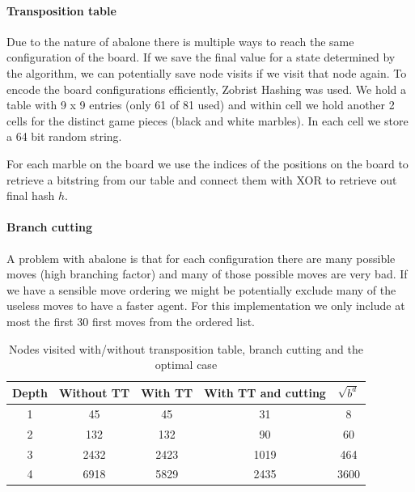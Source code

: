 \documentclass{llncs}
\begin{document}
\paragraph{Transposition table}
Due to the nature of abalone there is multiple ways to reach the same configuration of the board. If we save the final value for a state determined by the algorithm, we can potentially save node visits if we visit that node again. To encode the board configurations efficiently, Zobrist Hashing \cite{noauthor_zobrist_nodate} was used. We hold a table with 9 x 9 entries (only 61 of 81 used) and within cell we hold another 2 cells for the distinct game pieces (black and white marbles). In each cell we store a 64 bit random string.

For each marble on the board we use the indices of the positions on the board to retrieve a bitstring from our table and connect them with XOR to retrieve out final hash $h$.

\paragraph{Branch cutting}
A problem with abalone is that for each configuration there are many possible moves (high branching factor) and many of those possible moves are very bad. If we have a sensible move ordering we might be potentially exclude many of the useless moves to have a faster agent. For this implementation we only include at most the first 30 first moves from the ordered list.

\begin{table}
  \begin{center}
    \begin{tabular}{ | c | c | c | c | c | }
      \hline
      Depth & Without TT & With TT & With TT and cutting & $\sqrt{b^d}$ \\
      \hline
      1     & 45         & 45      & 31                  & 8            \\
      \hline
      2     & 132        & 132     & 90                  & 60           \\
      \hline
      3     & 2432       & 2423    & 1019                & 464          \\
      \hline
      4     & 6918       & 5829    & 2435                & 3600         \\
      \hline
    \end{tabular}
  \end{center}
  \caption{Nodes visited with/without transposition table, branch cutting and the optimal case}
  \label{node_count}
\end{table}
\end{document}
